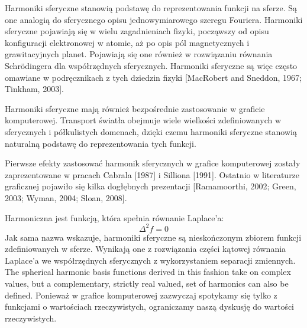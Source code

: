 \documentclass[polish]{article}
\numberwithin{equation}{section}
\begin{document}
Harmoniki sferyczne stanowią podstawę do reprezentowania funkcji na sferze. Są one analogią do sferycznego opisu jednowymiarowego szeregu Fouriera. Harmoniki sferyczne pojawiają się w wielu zagadnieniach fizyki, począwszy od opisu konfiguracji elektronowej w atomie, aż po opis pól magnetycznych i grawitacyjnych planet. Pojawiają się one również w rozwiązaniu równania Schr\"{o}dingera dla współrzędnych sferycznych. Harmoniki sferyczne są więc często omawiane w podręcznikach z tych dziedzin fizyki [MacRobert and Sneddon, 1967; Tinkham,
2003].

Harmoniki sferyczne mają również bezpośrednie zastosowanie w graficie komputerowej. Transport światła obejmuje wiele wielkości zdefiniowanych w sferycznych i półkulistych domenach, dzięki czemu harmoniki sferyczne stanowią naturalną podstawę do reprezentowania tych funkcji.

Pierwsze efekty zastosować harmonik sferycznych w grafice komputerowej zostały zaprezentowane w pracach Cabrala [1987] i Silliona [1991]. Ostatnio w literaturze graficznej pojawiło się kilka dogłębnych prezentacji [Ramamoorthi, 2002; Green, 2003; Wyman, 2004; Sloan, 2008].

\bigskip
Harmoniczna jest funkcją, która spełnia równanie Laplace'a:
\begin{equation}
\Delta^{2}f=0
\end{equation}
Jak sama nazwa wskazuje, harmoniki sferyczne są nieskończonym zbiorem funkcji zdefiniowanych w sferze. Wynikają one z rozwiązania części kątowej równania Laplace'a we współrzędnych sferycznych z wykorzystaniem separacji zmiennych. The spherical harmonic basis functions derived in this fashion take on complex values, but a complementary, strictly real valued, set of harmonics can also be defined. Ponieważ w grafice komputerowej zazwyczaj spotykamy się tylko z funkcjami o wartościach rzeczywistych, ograniczamy naszą dyskusję do wartości rzeczywistych. \\
\end{document}
